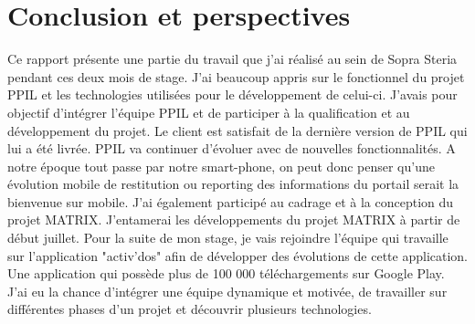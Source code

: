 \chapter*{Conclusion et perspectives}
\label{sec:conclusion}

Ce rapport présente une partie du travail que j'ai réalisé au sein de Sopra Steria pendant ces deux mois de stage. J'ai beaucoup appris sur le fonctionnel du projet PPIL et les technologies utilisées pour le développement de celui-ci. J'avais pour objectif d'intégrer l'équipe PPIL et de participer à la qualification et au développement du projet. Le client est satisfait de la dernière version de PPIL qui lui a été livrée. PPIL va continuer d'évoluer avec de nouvelles fonctionnalités. A notre époque tout passe par notre smart-phone, on peut donc penser qu'une évolution mobile de restitution ou reporting des informations du portail serait la bienvenue sur mobile. J'ai également participé au cadrage et à la conception du projet MATRIX. J'entamerai les développements du projet MATRIX à partir de début juillet. 
Pour la suite de mon stage, je vais rejoindre l'équipe qui travaille sur l'application "activ'dos" afin de développer des évolutions de cette application. Une application qui possède plus de 100 000 téléchargements sur Google Play. J'ai eu la chance d'intégrer une équipe dynamique et motivée, de travailler sur différentes phases d'un projet et découvrir plusieurs technologies.


